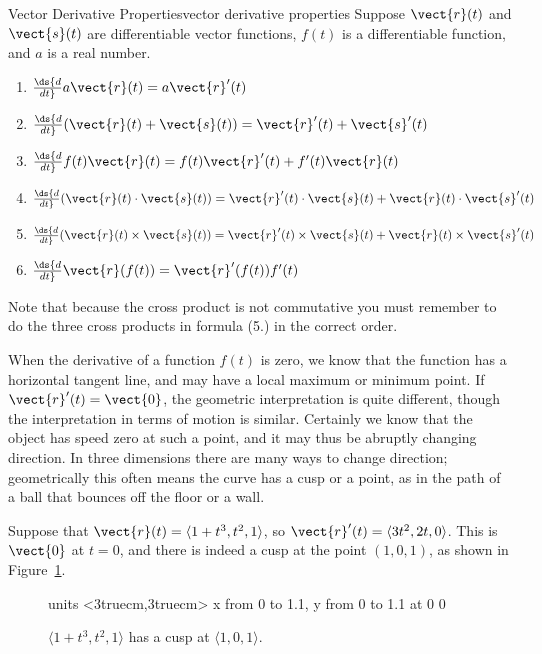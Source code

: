 \begin{theorem}{Vector Derivative Properties}{vector derivative properties}
Suppose $\vect{r}(t)$ and $\vect{s}(t)$ are differentiable vector functions,
$f(t)$ is a differentiable function, and $a$ is a real number.
\begin{enumerate}
\item	$\ds {d\over dt} a\vect{r}(t)= a\vect{r}'(t)$
\item	$\ds {d\over dt} (\vect{r}(t)+\vect{s}(t))=
\vect{r}'(t)+\vect{s}'(t)$
\item	$\ds {d\over dt} f(t)\vect{r}(t)= f(t)\vect{r}'(t)+f'(t)\vect{r}(t)$
\item	$\ds {d\over dt} (\vect{r}(t)\cdot\vect{s}(t))=
\vect{r}'(t)\cdot\vect{s}(t)+\vect{r}(t)\cdot\vect{s}'(t)$
\item	$\ds {d\over dt} (\vect{r}(t)\times\vect{s}(t))=
\vect{r}'(t)\times\vect{s}(t)+\vect{r}(t)\times\vect{s}'(t)$
\item	$\ds {d\over dt} \vect{r}(f(t))= \vect{r}'(f(t))f'(t)$
\end{enumerate}
\end{theorem}

Note that because the cross product is not commutative you must
remember to do the three cross products in formula (5.) in the correct
order. 

When the derivative of a function $f(t)$ is zero, we know that the
function has a horizontal tangent line, and may have a local maximum
or minimum point. If $\vect{r}'(t)=\vect{0}$, the geometric
interpretation is quite different, though the interpretation in terms
of motion is similar. Certainly we know that the object has speed zero
at such a point, and it may thus be abruptly changing direction. In
three dimensions there are many ways to change direction;
geometrically this often means the curve has a cusp or a point, as in
the path of a ball that bounces off the floor or a wall.

\begin{example}{}{}
Suppose that $\vect{r}(t)=\langle 1+t^3,t^2,1\rangle$, so
$\vect{r}'(t)=\langle 3t^2,2t,0\rangle$. This is $\vect{0}$ at $t=0$, and
there is indeed a cusp at the point $(1,0,1)$, as
shown in Figure~\ref{fig:spacecurve cusp}.
\end{example}

\begin{figure}[H]
\centerline{
\vbox{\beginpicture
\normalgraphs
\setcoordinatesystem units <3truecm,3truecm>
\setplotarea x from 0 to 1.1, y from 0 to 1.1
 at 0 0
\endpicture}}
\caption{$\langle 1+t^3,t^2,1\rangle$ has a cusp at $\langle 1,0,1\rangle$. \label{fig:spacecurve cusp}}
\end{figure}

